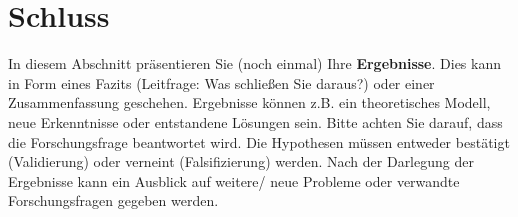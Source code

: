 
\section{Schluss}
In diesem Abschnitt präsentieren Sie (noch einmal) Ihre \textbf{Ergebnisse}. Dies kann in Form eines Fazits (Leitfrage: Was schließen Sie daraus?) oder einer Zusammenfassung geschehen. Ergebnisse können z.B. ein theoretisches Modell, neue Erkenntnisse oder entstandene Lösungen sein. Bitte achten Sie darauf, dass die Forschungsfrage beantwortet wird. Die Hypothesen müssen entweder bestätigt (Validierung) oder verneint (Falsifizierung) werden. Nach der Darlegung der Ergebnisse kann ein Ausblick auf weitere/ neue Probleme oder verwandte Forschungsfragen gegeben werden.
